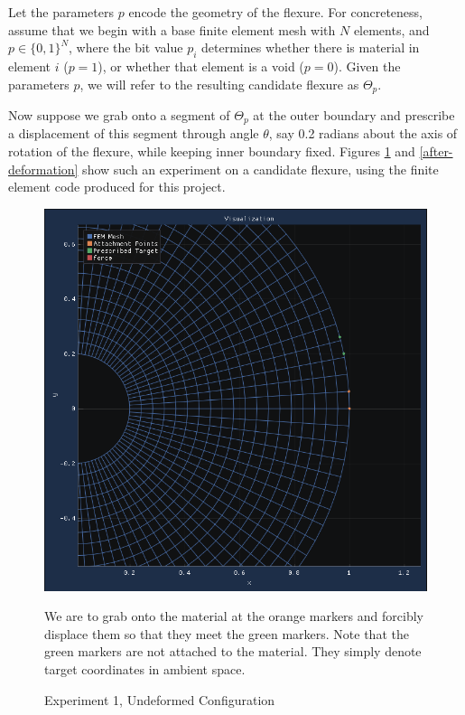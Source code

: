 \documentclass[11pt,letterpaper]{article}
\begin{document}
Let the parameters $p$ encode the geometry of the flexure. For concreteness, assume that we begin with a base finite element mesh with $N$ elements, and $p \in \{0, 1\}^N$, where the bit value $p_i$ determines whether there is material in element $i$ ($p=1$), or whether that element is a void ($p=0$). Given the parameters $p$, we will refer to the resulting candidate flexure as $\Theta_p$.

Now suppose we grab onto a segment of $\Theta_p$ at the outer boundary and prescribe a displacement of this segment through angle $\theta$, say 0.2 radians about the axis of rotation of the flexure, while keeping inner boundary fixed. Figures \ref{before-deformation} and \ref{after-deformation} show such an experiment on a candidate flexure, using the finite element code produced for this project.

\begin{figure}[H]
\begin{center}
\includegraphics[width=12cm, keepaspectratio]{before_deformation}
\caption{Experiment 1, Undeformed Configuration}
\label{before-deformation}
We are to grab onto the material at the orange markers and forcibly displace them so that they meet the green markers. Note that the green markers are not attached to the material. They simply denote target coordinates in ambient space.
\end{center}
\end{figure}
\end{document}
